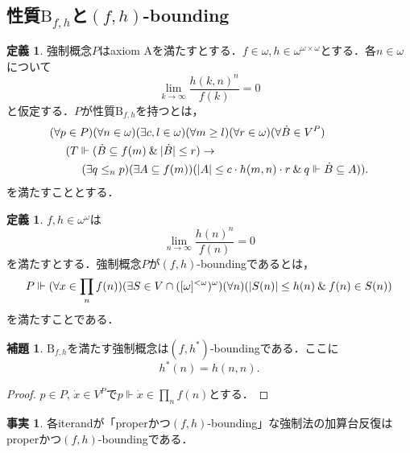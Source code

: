 \documentclass[uplatex]{jsarticle}
\newcommand\forces{\Vdash}
\newcommand{\AND}{\mathbin{\&}}
\DeclarePairedDelimiter\abs{\lvert}{\rvert}
\renewcommand\subset{\subseteq}
\newcommand{\todo}[1][]{%
	\ifthenelse{\equal{#1}{}}{%
		\textcolor{red}{[TODO]}%
	}{%
		\textcolor{red}{[TODO: #1]}%
	}%
}
\theoremstyle{definition}
\newtheorem{defi}[thm]{定義}
\newtheorem{lem}[thm]{補題}
\newtheorem{fact}[thm]{事実}
\begin{document}
	\subsection{性質$\mathrm{B}_{f, h}$と$(f, h)$-bounding}
	
	\begin{defi}
		強制概念$P$はaxiom Aを満たすとする．$f \in \omega, h \in \omega^{\omega \times \omega}$とする．各$n \in \omega$について
		\[
		\lim_{k \to \infty} \frac{h(k, n)^n}{f(k)} = 0
		\]
		と仮定する．$P$が性質$\mathrm{B}_{f, h}$を持つとは，
		\begin{align*}
			&(\forall p \in P)(\forall n \in \omega)(\exists c, l \in \omega)(\forall m \ge l)(\forall r \in \omega)(\forall \dot{B} \in V^P) \\
			& \hspace{0.5cm} (T \forces (\dot{B} \subset f(m) \AND \abs{\dot{B}} \le r) \rightarrow \\
			& \hspace{1cm} (\exists q \le_n p)(\exists A \subset f(m))(\abs{A} \le c \cdot h(m, n) \cdot r \AND q \forces \dot{B} \subset A)).
		\end{align*}
		を満たすこととする．
	\end{defi}
	
	
	\begin{defi}
		$f, h \in \omega^\omega$は
		\[
		\lim_{n \to \infty} \frac{h(n)^n}{f(n)} = 0
		\]
		を満たすとする．強制概念$P$が$(f, h)$-boundingであるとは，
		\[
		P \forces (\forall x \in \prod_n f(n))(\exists S \in V \cap ([\omega]^{<\omega})^\omega)(\forall n)(\abs{S(n)} \le h(n) \AND f(n) \in S(n))
		\]
		を満たすことである．
	\end{defi}
	
	\begin{lem}
		$\mathrm{B}_{f, h}$を満たす強制概念は$(f, h^*)$-boundingである．ここに
		\[ h^*(n) = h(n, n). \]
	\end{lem}
	\begin{proof}
		$p \in P$, $\dot{x} \in V^P$で$p \forces \dot{x} \in \prod_n f(n)$とする． \todo
	\end{proof}
	
	\begin{fact}
		各iterandが「properかつ$(f, h)$-bounding」な強制法の加算台反復はproperかつ$(f, h)$-boundingである．
	\end{fact}
\end{document}
